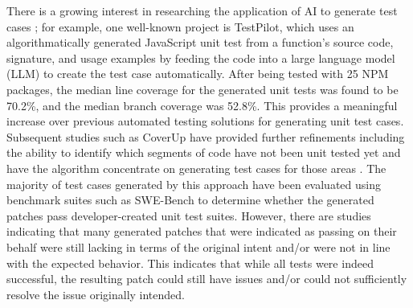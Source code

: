 \documentclass[conference]{IEEEtran}
\begin{document}
There is a growing interest in researching the application of AI to generate test cases \cite{siddiq2024using,gao2025current,celik2025review,ouedraogo2024large,deljouyi2024leveraging,molina2025test,pan2024multi,qiu2025today,milanese2026human}; for example, one well-known project is TestPilot, which uses an algorithmatically generated JavaScript unit test from a function's source code, signature, and usage examples by feeding the code into a large language model (LLM) to create the test case automatically. After being tested with 25 NPM packages, the median line coverage for the generated unit tests was found to be 70.2\%, and the median branch coverage was 52.8\%. This provides a meaningful increase over previous automated testing solutions for generating unit test cases. Subsequent studies such as CoverUp have provided further refinements including the ability to identify which segments of code have not been unit tested yet and have the algorithm concentrate on generating test cases for those areas \cite{altmayer2025coverup}. The majority of test cases generated by this approach have been evaluated using benchmark suites such as SWE-Bench \cite{jimenez2023swe} to determine whether the generated patches pass developer-created unit test suites. However, there are studies indicating that many generated patches that were indicated as passing on their behalf were still lacking in terms of the original intent and/or were not in line with the expected behavior. This indicates that while all tests were indeed successful, the resulting patch could still have issues and/or could not sufficiently resolve the issue originally intended.

\end{document}
